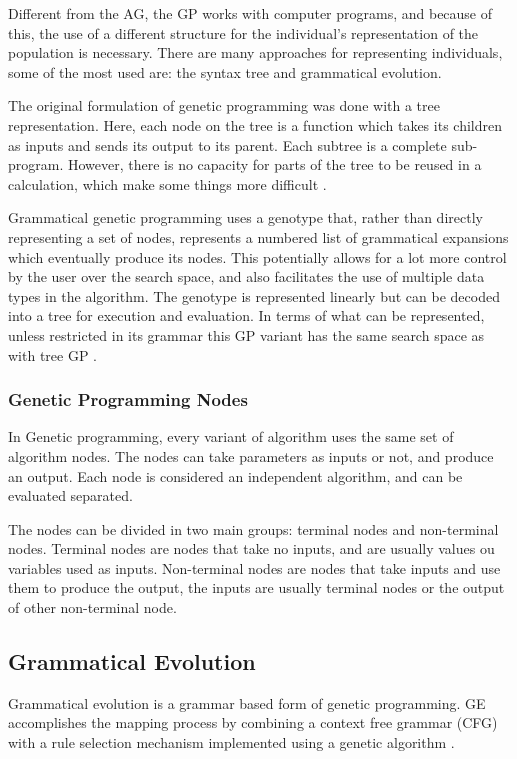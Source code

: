 \documentclass[journal]{IEEEtran}
\begin{document}
Different from the AG, the GP works with computer programs, and because of this, the use of a different structure for the individual's representation of the population is necessary. There are many approaches for representing individuals, some of the most used are: the syntax tree and grammatical evolution.

The original formulation of genetic programming was done with a tree representation. Here, each node on the tree is a function which takes its children as inputs and sends its output to its parent. Each subtree is a complete sub-program. However, there is no capacity for parts of the tree to be reused in a calculation, which make some things more difficult \cite{harris2015comparison}.

Grammatical genetic programming uses a genotype that, rather than directly representing a set of nodes, represents a numbered list of grammatical expansions which eventually produce its nodes. This potentially allows for a lot more control by the user over the search space, and also facilitates the use of multiple data types in the algorithm. The genotype is represented linearly but can be decoded into a tree for execution and evaluation. In terms of what can be represented, unless restricted in its grammar this GP variant has the same search space as with tree GP \cite{harris2015comparison}.

\subsubsection{Genetic Programming Nodes}

In Genetic programming, every variant of algorithm uses the same set of algorithm nodes. The nodes can take parameters as inputs or not, and produce an output. Each node is considered an independent algorithm, and can be evaluated separated.

The nodes can be divided in two main groups: terminal nodes and non-terminal nodes. Terminal nodes are nodes that take no inputs, and are usually values ou variables used as inputs. Non-terminal nodes are nodes that take inputs and use them to produce the output, the inputs are usually terminal nodes or the output of other non-terminal node.

\subsection{Grammatical Evolution}

Grammatical evolution is a grammar based form of genetic programming. GE accomplishes the mapping process by combining a context free grammar (CFG) with a rule selection mechanism implemented using a genetic algorithm \cite{byrne2015optimising}.
\end{document}
